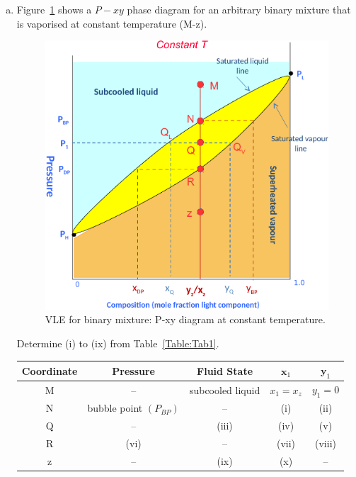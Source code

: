 \documentclass[calculator,allquestions,datasheet,solutions]{exam_newMarcus2}
\begin{document}
\clearpage


\begin{question}
  \begin{enumerate}[a)]
    \item Figure~\ref{Figure:Fig1} shows a $P-xy$ phase diagram for an arbitrary binary mixture that is vaporised at constant temperature (M-z).
      \begin{figure}[h]
        \begin{center}
          \includegraphics[width=.5\linewidth,clip]{./Pics/VLE_Pxy_Diagram3b}
          \caption{VLE for binary mixture: P-xy diagram at constant temperature.}\label{Figure:Fig1}
        \end{center}
      \end{figure}
      Determine (i) to (ix) from Table~\ref{Table:Tab1}.
      \begin{table}[h]
        \begin{center}
          \begin{tabular}{||c| c | c | c | c ||}
            \hline\hline
            {\bf Coordinate} & {\bf Pressure} & {\bf Fluid State} & $\mathbf{x}_{1}$ & $\mathbf{y}_{1}$ \\
            \hline
                 M           &   --           &   subcooled liquid & $x_{1}=x_{z}$    & $y_{1}=0$        \\
                 N           &bubble point $\left(P_{BP}\right)$&--& (i)             & (ii)            \\
                 Q           &  --            &     (iii)          & (iv)             & (v)            \\
                 R           &  (vi)          &     --             & (vii)             & (viii)            \\
                 z           &  --           &     (ix)            & (x)         &  --            \\                 

\end{tabular}
\end{center}
\end{table}
\end{enumerate}
\end{question}
\end{document}
